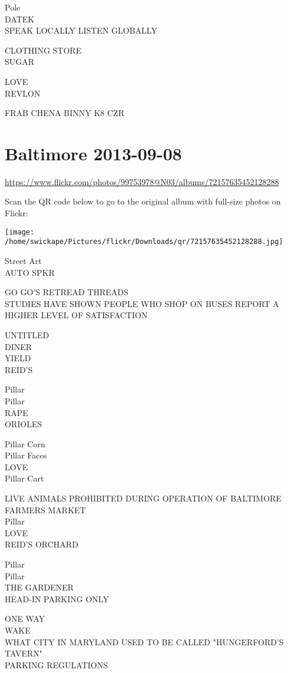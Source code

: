 \documentclass[10pt,letterpaper]{article}
\begin{document}
Pole\\
DATEK\\
SPEAK LOCALLY LISTEN GLOBALLY

CLOTHING STORE\\
SUGAR

LOVE\\
REVLON

FRAB CHENA BINNY K8 CZR


\section*{Baltimore 2013-09-08}

\url{https://www.flickr.com/photos/99753978@N03/albums/72157635452128288}

Scan the QR code below to go to the original album with full-size photos on Flickr:

\texttt{[image: /home/swickape/Pictures/flickr/Downloads/qr/72157635452128288.jpg]}


Street Art\\
AUTO SPKR

GO GO'S RETREAD THREADS\\
STUDIES HAVE SHOWN PEOPLE WHO SHOP ON BUSES REPORT A HIGHER LEVEL OF SATISFACTION

UNTITLED\\
DINER\\
YIELD\\
REID'S

Pillar\\
Pillar\\
RAPE\\
ORIOLES

Pillar Corn\\
Pillar Faces\\
LOVE\\
Pillar Cart

LIVE ANIMALS PROHIBITED DURING OPERATION OF BALTIMORE FARMERS MARKET\\
Pillar\\
LOVE\\
REID'S ORCHARD

Pillar\\
Pillar\\
THE GARDENER\\
HEAD{-}IN PARKING ONLY

ONE WAY\\
WAKE\\
WHAT CITY IN MARYLAND USED TO BE CALLED "HUNGERFORD'S TAVERN"\\
PARKING REGULATIONS
\end{document}
